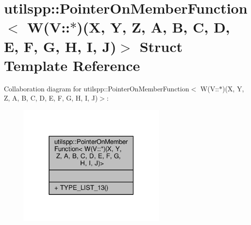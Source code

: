 \hypertarget{structutilspp_1_1PointerOnMemberFunction_3_01W_07V_1_1_5_08_07X_00_01Y_00_01Z_00_01A_00_01B_00_0f132510bb9cf4ca10da452dc78c1be57}{\section{utilspp\-:\-:Pointer\-On\-Member\-Function$<$ W(V\-:\-:$\ast$)(X, Y, Z, A, B, C, D, E, F, G, H, I, J)$>$ Struct Template Reference}
\label{structutilspp_1_1PointerOnMemberFunction_3_01W_07V_1_1_5_08_07X_00_01Y_00_01Z_00_01A_00_01B_00_0f132510bb9cf4ca10da452dc78c1be57}
}


Collaboration diagram for utilspp\-:\-:Pointer\-On\-Member\-Function$<$ W(V\-:\-:$\ast$)(X, Y, Z, A, B, C, D, E, F, G, H, I, J)$>$\-:\nopagebreak
\begin{figure}[H]
\begin{center}
\leavevmode
\includegraphics[width=210pt]{structutilspp_1_1PointerOnMemberFunction_3_01W_07V_1_1_5_08_07X_00_01Y_00_01Z_00_01A_00_01B_00_087d024fb1d4d2bc3e86a530d927ea0e9}
\end{center}
\end{figure}
